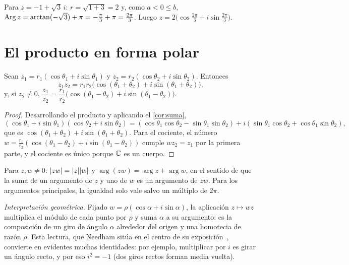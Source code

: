 \begin{ejemplo}\label{ej:polar}
Para $z=-1+\sqrt3\,i$: $r=\sqrt{1+3}=2$ y, como $a<0\le b$, $\operatorname{Arg} z=\arctan(-\sqrt3)+\pi=-\frac{\pi}{3}+\pi=\frac{2\pi}{3}$. Luego $z=2\bigl(\cos\frac{2\pi}{3}+i\sin\frac{2\pi}{3}\bigr)$.
\end{ejemplo}

\section{El producto en forma polar}

\begin{teorema}\label{teo:producto-polar}
Sean $z_1=r_1(\cos\theta_1+i\sin\theta_1)$ y $z_2=r_2(\cos\theta_2+i\sin\theta_2)$. Entonces
\[
z_1z_2=r_1r_2\bigl(\cos(\theta_1+\theta_2)+i\sin(\theta_1+\theta_2)\bigr),
\]
y, si $z_2\ne0$, $\dfrac{z_1}{z_2}=\dfrac{r_1}{r_2}\bigl(\cos(\theta_1-\theta_2)+i\sin(\theta_1-\theta_2)\bigr)$.
\end{teorema}

\begin{proof}
Desarrollando el producto y aplicando el \cref{cor:suma},
\[
(\cos\theta_1+i\sin\theta_1)(\cos\theta_2+i\sin\theta_2)=(\cos\theta_1\cos\theta_2-\sin\theta_1\sin\theta_2)+i(\sin\theta_1\cos\theta_2+\cos\theta_1\sin\theta_2),
\]
que es $\cos(\theta_1+\theta_2)+i\sin(\theta_1+\theta_2)$. Para el cociente, el número $w=\frac{r_1}{r_2}(\cos(\theta_1-\theta_2)+i\sin(\theta_1-\theta_2))$ cumple $wz_2=z_1$ por la primera parte, y el cociente es único porque $\mathbb{C}$ es un cuerpo.
\end{proof}

\begin{corolario}\label{cor:arg-producto}
Para $z,w\ne0$: $\lvert zw\rvert=\lvert z\rvert\lvert w\rvert$ y $\arg(zw)=\arg z+\arg w$, en el sentido de que la suma de un argumento de $z$ y uno de $w$ es un argumento de $zw$. Para los argumentos principales, la igualdad solo vale salvo un múltiplo de $2\pi$.
\end{corolario}

\emph{Interpretación geométrica.} Fijado $w=\rho(\cos\alpha+i\sin\alpha)$, la aplicación $z\mapsto wz$ multiplica el módulo de cada punto por $\rho$ y suma $\alpha$ a su argumento: es la composición de un giro de ángulo $\alpha$ alrededor del origen y una homotecia de razón $\rho$. Esta lectura, que Needham sitúa en el centro de su exposición~\cite[cap.~1]{needham}, convierte en evidentes muchas identidades: por ejemplo, multiplicar por $i$ es girar un ángulo recto, y por eso $i^{2}=-1$ (dos giros rectos forman media vuelta).

